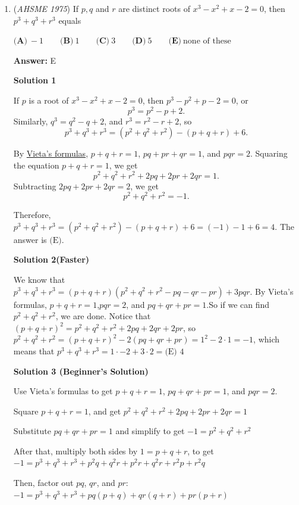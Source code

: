 \begin{enumerate}
 --AndrewZhong2012--

 


	\item (\textit{AHSME 1975}) If $p, q$ and $r$ are distinct roots of $x^3-x^2+x-2=0$, then $p^3+q^3+r^3$ equals


 $\textbf{(A)}\ -1 \qquad \textbf{(B)}\ 1 \qquad \textbf{(C)}\ 3 \qquad \textbf{(D)}\ 5 \qquad \textbf{(E)}\ \text{none of these}$

 \textbf{Answer: }E



\textbf{Solution 1}

If $p$ is a root of $x^3 - x^2 + x - 2 = 0$, then $p^3 - p^2 + p - 2 = 0$, or
 \[p^3 = p^2 - p + 2.\]Similarly, $q^3 = q^2 - q + 2$, and $r^3 = r^2 - r + 2$, so
 \[p^3 + q^3 + r^3 = (p^2 + q^2 + r^2) - (p + q + r) + 6.\]

 By \href{https://artofproblemsolving.com/wiki/index.php?title=Vieta\%27s\_formulas}{Vieta's formulas}, $p + q + r = 1$, $pq + pr + qr = 1$, and $pqr = 2$. Squaring the equation $p + q + r = 1$, we get
 \[p^2 + q^2 + r^2 + 2pq + 2pr + 2qr = 1.\]Subtracting $2pq + 2pr + 2qr = 2$, we get
 \[p^2 + q^2 + r^2 = -1.\]

 Therefore, $p^3 + q^3 + r^3 = (p^2 + q^2 + r^2) - (p + q + r) + 6 = (-1) - 1  + 6 = \boxed{4}$. The answer is $\text{(E)}$.

 



\textbf{Solution 2(Faster)}

We know that $p^3+q^3+r^3=(p+q+r)(p^2+q^2+r^2-pq-qr-pr)+3pqr$. By Vieta's formulas, $p+q+r=1$,$pqr=2$, and $pq+qr+pr=1$.So if we can find $p^2+q^2+r^2$, we are done. Notice that $(p+q+r)^2=p^2+q^2+r^2+2pq+2qr+2pr$, so $p^2+q^2+r^2=(p+q+r)^2-2(pq+qr+pr)=1^2-2\cdot1=-1$, which means that $p^3+q^3+r^3=1\cdot-2+3\cdot2=\boxed{\text{(E) }4}$




\textbf{Solution 3 (Beginner's Solution)}

Use Vieta's formulas to get $p+q+r=1$, $pq+qr+pr=1$, and $pqr=2$.

 Square $p+q+r=1$, and get $p^2+q^2+r^2+2pq+2pr+2qr=1$

 Substitute $pq+qr+pr=1$ and simplify to get $-1=p^2+q^2+r^2$

 After that, multiply both sides by $1=p+q+r$, to get $-1=p^3+q^3+r^3+p^2q+q^2r+p^2r+q^2r+r^2p+r^2q$

 Then, factor out $pq$, $qr$, and $pr$:$-1=p^3+q^3+r^3+pq(p+q)+qr(q+r)+pr(p+r)$


\end{enumerate}
